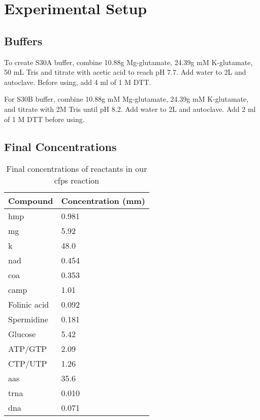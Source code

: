 \appendix
\chapter{Experimental Setup}
\label{app:exp}

\section{Buffers}
To create S30A buffer, combine 10.88g Mg-glutamate, 24.39g mM K-glutamate, 50 mL Tris and titrate with acetic acid to reach pH 7.7.
Add water to 2L and autoclave.
Before using, add 4 ml of 1 M DTT.

For S30B buffer, combine 10.88g mM Mg-glutamate, 24.39g mM K-glutamate, and titrate with 2M Tris until pH 8.2.
Add water to 2L and autoclave.
Add 2 ml of 1 M DTT before using.

\section{Final Concentrations}

\begin{table}[h!]
\centering
\begin{tabular}{ll}
Compound     & Concentration (\gls{mm}) \\ \hline
\gls{hmp}           & 0.981              \\
\gls{mg}           & 5.92               \\
\gls{k}           & 48.0               \\
\gls{nad}          & 0.454              \\
\gls{coa}          & 0.353              \\
\gls{camp}         & 1.01               \\
Folinic acid & 0.092              \\
Spermidine   & 0.181              \\
Glucose      & 5.42               \\
ATP/GTP      & 2.09               \\
CTP/UTP      & 1.26               \\
\glspl{aa}  & 35.6               \\
\gls{trna}        & 0.010              \\
\gls{dna}          & 0.071             
\end{tabular}
\caption{Final concentrations of reactants in our \gls{cfps} reaction}
\label{tab:cf-conc}
\end{table}

